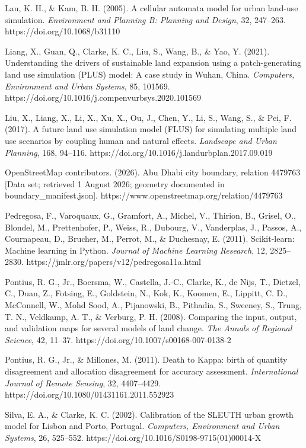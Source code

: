 Lau, K. H., \& Kam, B. H. (2005). A cellular automata model for urban
land-use simulation. \emph{Environment and Planning B: Planning and
Design}, 32, 247--263. https://doi.org/10.1068/b31110

Liang, X., Guan, Q., Clarke, K. C., Liu, S., Wang, B., \& Yao, Y.
(2021). Understanding the drivers of sustainable land expansion using a
patch-generating land use simulation (PLUS) model: A case study in
Wuhan, China. \emph{Computers, Environment and Urban Systems}, 85,
101569. https://doi.org/10.1016/j.compenvurbsys.2020.101569

Liu, X., Liang, X., Li, X., Xu, X., Ou, J., Chen, Y., Li, S., Wang, S.,
\& Pei, F. (2017). A future land use simulation model (FLUS) for
simulating multiple land use scenarios by coupling human and natural
effects. \emph{Landscape and Urban Planning}, 168, 94--116.
https://doi.org/10.1016/j.landurbplan.2017.09.019

OpenStreetMap contributors. (2026). Abu Dhabi city boundary, relation
4479763 {[}Data set; retrieved 1 August 2026; geometry documented in
boundary\_manifest.json{]}.
https://www.openstreetmap.org/relation/4479763

Pedregosa, F., Varoquaux, G., Gramfort, A., Michel, V., Thirion, B.,
Grisel, O., Blondel, M., Prettenhofer, P., Weiss, R., Dubourg, V.,
Vanderplas, J., Passos, A., Cournapeau, D., Brucher, M., Perrot, M., \&
Duchesnay, E. (2011). Scikit-learn: Machine learning in Python.
\emph{Journal of Machine Learning Research}, 12, 2825--2830.
https://jmlr.org/papers/v12/pedregosa11a.html

Pontius, R. G., Jr., Boersma, W., Castella, J.-C., Clarke, K., de Nijs,
T., Dietzel, C., Duan, Z., Fotsing, E., Goldstein, N., Kok, K., Koomen,
E., Lippitt, C. D., McConnell, W., Mohd Sood, A., Pijanowski, B.,
Pithadia, S., Sweeney, S., Trung, T. N., Veldkamp, A. T., \& Verburg, P.
H. (2008). Comparing the input, output, and validation maps for several
models of land change. \emph{The Annals of Regional Science}, 42,
11--37. https://doi.org/10.1007/s00168-007-0138-2

Pontius, R. G., Jr., \& Millones, M. (2011). Death to Kappa: birth of
quantity disagreement and allocation disagreement for accuracy
assessment. \emph{International Journal of Remote Sensing}, 32,
4407--4429. https://doi.org/10.1080/01431161.2011.552923

Silva, E. A., \& Clarke, K. C. (2002). Calibration of the SLEUTH urban
growth model for Lisbon and Porto, Portugal. \emph{Computers,
Environment and Urban Systems}, 26, 525--552.
https://doi.org/10.1016/S0198-9715(01)00014-X

